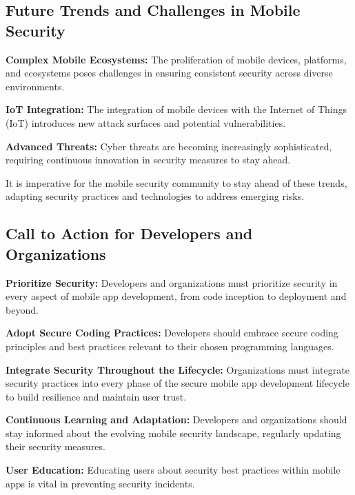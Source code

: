 \documentclass[conference]{IEEEtran}
\begin{document}
\subsection{Future Trends and Challenges in Mobile Security}

\textbf{Complex Mobile Ecosystems:} The proliferation of mobile devices, platforms, and ecosystems poses challenges in ensuring consistent security across diverse environments.

\textbf{IoT Integration:} The integration of mobile devices with the Internet of Things (IoT) introduces new attack surfaces and potential vulnerabilities.

\textbf{Advanced Threats:} Cyber threats are becoming increasingly sophisticated, requiring continuous innovation in security measures to stay ahead.

It is imperative for the mobile security community to stay ahead of these trends, adapting security practices and technologies to address emerging risks.

\subsection{Call to Action for Developers and Organizations}

\textbf{Prioritize Security:} Developers and organizations must prioritize security in every aspect of mobile app development, from code inception to deployment and beyond.

\textbf{Adopt Secure Coding Practices:} Developers should embrace secure coding principles and best practices relevant to their chosen programming languages.

\textbf{Integrate Security Throughout the Lifecycle:} Organizations must integrate security practices into every phase of the secure mobile app development lifecycle to build resilience and maintain user trust.

\textbf{Continuous Learning and Adaptation:} Developers and organizations should stay informed about the evolving mobile security landscape, regularly updating their security measures.

\textbf{User Education:} Educating users about security best practices within mobile apps is vital in preventing security incidents.

\end{document}
